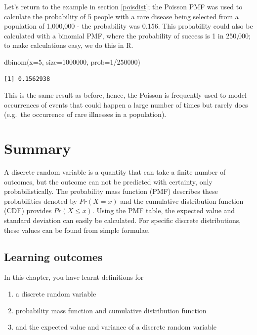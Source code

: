 \documentclass[
  oneside]{krantz}
\newenvironment{Shaded}{\begin{snugshade}}{\end{snugshade}}
\newcommand{\AttributeTok}[1]{\textcolor[rgb]{0.77,0.63,0.00}{#1}}
\newcommand{\DecValTok}[1]{\textcolor[rgb]{0.00,0.00,0.81}{#1}}
\newcommand{\FunctionTok}[1]{\textcolor[rgb]{0.00,0.00,0.00}{#1}}
\newcommand{\NormalTok}[1]{#1}
\newcommand{\SpecialCharTok}[1]{\textcolor[rgb]{0.00,0.00,0.00}{#1}}
\begin{document}
Let's return to the example in section \ref{poisdist}; the Poisson PMF was used to calculate the probability of 5 people with a rare disease being selected from a population of 1,000,000 - the probability was 0.156. This probability could also be calculated with a binomial PMF, where the probability of success is 1 in 250,000; to make calculations easy, we do this in R.

\begin{Shaded}
\begin{Highlighting}[]
\FunctionTok{dbinom}\NormalTok{(}\AttributeTok{x=}\DecValTok{5}\NormalTok{, }\AttributeTok{size=}\DecValTok{1000000}\NormalTok{, }\AttributeTok{prob=}\DecValTok{1}\SpecialCharTok{/}\DecValTok{250000}\NormalTok{)}
\end{Highlighting}
\end{Shaded}

\begin{verbatim}
[1] 0.1562938
\end{verbatim}

This is the same result as before, hence, the Poisson is frequently used to model occurrences of events that could happen a large number of times but rarely does (e.g.~the occurrence of rare illnesses in a population).

\hypertarget{SUMdiscrv}{%
\section{Summary}\label{SUMdiscrv}}

A discrete random variable is a quantity that can take a finite number of outcomes, but the outcome can not be predicted with certainty, only probabilistically. The probability mass function (PMF) describes these probabilities denoted by \(Pr(X=x)\) and the cumulative distribution function (CDF) provides \(Pr(X \le x)\). Using the PMF table, the expected value and standard deviation can easily be calculated. For specific discrete distributions, these values can be found from simple formulae.

\hypertarget{learning-outcomes-1}{%
\subsection{Learning outcomes}\label{learning-outcomes-1}}

In this chapter, you have learnt definitions for

\begin{enumerate}
\def\labelenumi{\arabic{enumi}.}
\item
  a discrete random variable
\item
  probability mass function and cumulative distribution function
\item
  and the expected value and variance of a discrete random variable
\end{enumerate}
\end{document}
